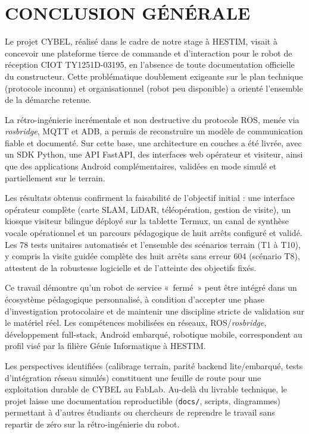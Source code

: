 \newpage
\section*{\centering CONCLUSION GÉNÉRALE}

Le projet CYBEL, réalisé dans le cadre de notre stage à
HESTIM, visait à concevoir une plateforme tierce de commande et d'interaction
pour le robot de réception CIOT TY1251D-03195, en l'absence de toute
documentation officielle du constructeur. Cette problématique doublement
exigeante sur le plan technique (protocole inconnu) et organisationnel
(robot peu disponible) a orienté l'ensemble de la démarche retenue.

La rétro-ingénierie incrémentale et non destructive du protocole ROS, menée
via \textit{rosbridge}, MQTT et ADB, a permis de reconstruire un modèle de
communication fiable et documenté. Sur cette base, une architecture en
couches a été livrée, avec un SDK Python, une API FastAPI, des interfaces
web opérateur et visiteur, ainsi que des applications Android complémentaires,
validées en mode simulé et partiellement sur le terrain.

Les résultats obtenus confirment la faisabilité de l'objectif initial : une
interface opérateur complète (carte SLAM, LiDAR, téléopération, gestion de
visite), un kiosque visiteur bilingue déployé sur la tablette Termux, un
canal de synthèse vocale opérationnel et un parcours pédagogique de huit
arrêts configuré et validé. Les 78 tests unitaires automatisés et
l'ensemble des scénarios terrain (T1 à T10), y compris la visite guidée
complète des huit arrêts sans erreur 604 (scénario T8), attestent de la
robustesse logicielle et de l'atteinte des objectifs fixés.

Ce travail démontre qu'un robot de service «~fermé~» peut être intégré dans
un écosystème pédagogique personnalisé, à condition d'accepter une phase
d'investigation protocolaire et de maintenir une discipline
stricte de validation sur le matériel réel. Les compétences mobilisées en
réseaux, ROS/\textit{rosbridge}, développement full-stack, Android embarqué,
robotique mobile, correspondent au profil visé par la filière Génie
Informatique à HESTIM.

Les perspectives identifiées (calibrage terrain, parité backend lite/embarqué,
tests d'intégration réseau simulés) constituent une feuille de route pour
une exploitation durable de CYBEL au FabLab. Au-delà du livrable technique,
le projet laisse une documentation reproductible (\texttt{docs/}, scripts,
diagrammes) permettant à d'autres étudiants ou chercheurs de reprendre le
travail sans repartir de zéro sur la rétro-ingénierie du robot.
